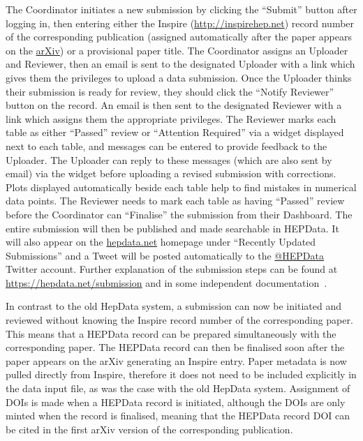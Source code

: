 \documentclass[a4paper]{jpconf}
\begin{document}
The Coordinator initiates a new submission by clicking the ``Submit'' button after logging in, then entering either the Inspire (\url{http://inspirehep.net}) record number of the corresponding publication (assigned automatically after the paper appears on the \href{https://arxiv.org/}{arXiv}) or a provisional paper title.  The Coordinator assigns an Uploader and Reviewer, then an email is sent to the designated Uploader with a link which gives them the privileges to upload a data submission.  Once the Uploader thinks their submission is ready for review, they should click the ``Notify Reviewer'' button on the record.  An email is then sent to the designated Reviewer with a link which assigns them the appropriate privileges.  The Reviewer marks each table as either ``Passed'' review or ``Attention Required'' via a widget displayed next to each table, and messages can be entered to provide feedback to the Uploader.  The Uploader can reply to these messages (which are also sent by email) via the widget before uploading a revised submission with corrections.  Plots displayed automatically beside each table help to find mistakes in numerical data points.  The Reviewer needs to mark each table as having ``Passed'' review before the Coordinator can ``Finalise'' the submission from their Dashboard.  The entire submission will then be published and made searchable in HEPData.  It will also appear on the \href{https://www.hepdata.net}{hepdata.net} homepage under ``Recently Updated Submissions'' and a Tweet will be posted automatically to the \href{https://twitter.com/HEPData}{@HEPData} Twitter account.  Further explanation of the submission steps can be found at \url{https://hepdata.net/submission} and in some independent documentation~\cite{matteo_bonanomi_2016_197109}.

In contrast to the old HepData system, a submission can now be initiated and reviewed without knowing the Inspire record number of the corresponding paper.  This means that a HEPData record can be prepared simultaneously with the corresponding paper.  The HEPData record can then be finalised soon after the paper appears on the arXiv generating an Inspire entry.  Paper metadata is now pulled directly from Inspire, therefore it does not need to be included explicitly in the data input file, as was the case with the old HepData system.  Assignment of DOIs is made when a HEPData record is initiated, although the DOIs are only minted when the record is finalised, meaning that the HEPData record DOI can be cited in the first arXiv version of the corresponding publication.
\end{document}
